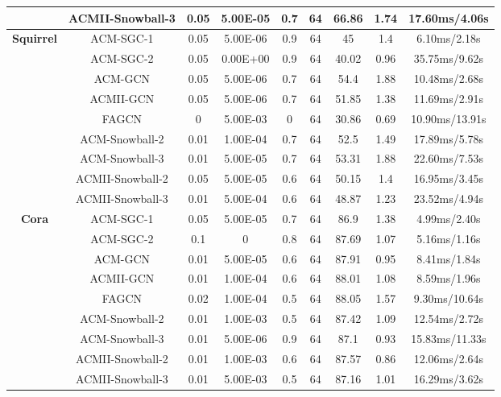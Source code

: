 \documentclass{article}
\newcommand{\0}{{\boldsymbol{0}}}
\newcommand{\6}{{\partial}}
\newcommand{\8}{{\infty}}
\newcommand{\4}{{\nabla}}
\begin{document}
\begin{table}[htbp]
{\begin{tabular}{c|c|ccccccc}
          & ACMII-Snowball-3 & 0.05  & 5.00E-05 & 0.7   & 64    & 66.86 & 1.74  & 17.60ms/4.06s \\
           \midrule
    \multirow{9}[0]{*}{\textbf{Squirrel}} & ACM-SGC-1 & 0.05  & 5.00E-06 & 0.9   & 64    & 45    & 1.4   & 6.10ms/2.18s \\
          & ACM-SGC-2 & 0.05  & 0.00E+00 & 0.9   & 64    & 40.02 & 0.96  & 35.75ms/9.62s \\
          & ACM-GCN & 0.05  & 5.00E-06 & 0.7   & 64    & 54.4  & 1.88  & 10.48ms/2.68s \\
          & ACMII-GCN & 0.05  & 5.00E-06 & 0.7   & 64    & 51.85 & 1.38  & 11.69ms/2.91s \\
          & FAGCN & 0     & 5.00E-03 & 0     & 64    & 30.86 & 0.69  & 10.90ms/13.91s \\
          & ACM-Snowball-2 & 0.01  & 1.00E-04 & 0.7   & 64    & 52.5  & 1.49  & 17.89ms/5.78s \\
          & ACM-Snowball-3 & 0.01  & 5.00E-05 & 0.7   & 64    & 53.31 & 1.88  & 22.60ms/7.53s \\
          & ACMII-Snowball-2 & 0.05  & 5.00E-05 & 0.6   & 64    & 50.15 & 1.4   & 16.95ms/3.45s \\
          & ACMII-Snowball-3 & 0.01  & 5.00E-04 & 0.6   & 64    & 48.87 & 1.23  & 23.52ms/4.94s \\
           \midrule
    \multirow{9}[0]{*}{\textbf{Cora}} & ACM-SGC-1 & 0.05  & 5.00E-05 & 0.7   & 64    & 86.9  & 1.38  & 4.99ms/2.40s \\
          & ACM-SGC-2 & 0.1   & 0     & 0.8   & 64    & 87.69 & 1.07  & 5.16ms/1.16s \\
          & ACM-GCN & 0.01  & 5.00E-05 & 0.6   & 64    & 87.91 & 0.95  & 8.41ms/1.84s \\
          & ACMII-GCN & 0.01  & 1.00E-04 & 0.6   & 64    & 88.01 & 1.08  & 8.59ms/1.96s \\
          & FAGCN & 0.02  & 1.00E-04 & 0.5   & 64    & 88.05 & 1.57  & 9.30ms/10.64s \\
          & ACM-Snowball-2 & 0.01  & 1.00E-03 & 0.5   & 64    & 87.42 & 1.09  & 12.54ms/2.72s \\
          & ACM-Snowball-3 & 0.01  & 5.00E-06 & 0.9   & 64    & 87.1  & 0.93  & 15.83ms/11.33s \\
          & ACMII-Snowball-2 & 0.01  & 1.00E-03 & 0.6   & 64    & 87.57 & 0.86  & 12.06ms/2.64s \\
          & ACMII-Snowball-3 & 0.01  & 5.00E-03 & 0.5   & 64    & 87.16 & 1.01  & 16.29ms/3.62s \\

\end{tabular}}
\end{table}
\end{document}
